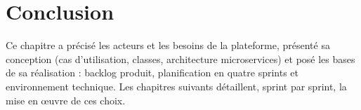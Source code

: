 \section*{Conclusion}
Ce chapitre a précisé les acteurs et les besoins de la plateforme, présenté
sa conception (cas d'utilisation, classes, architecture microservices) et
posé les bases de sa réalisation : backlog produit, planification en quatre
sprints et environnement technique. Les chapitres suivants détaillent, sprint
par sprint, la mise en \oe{}uvre de ces choix.
